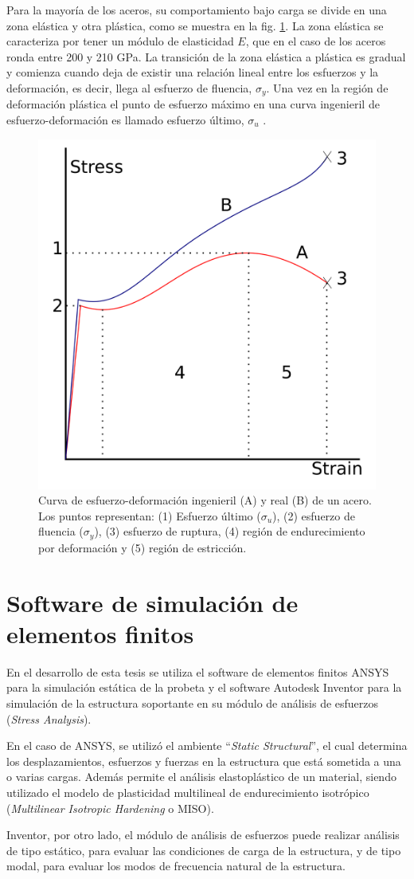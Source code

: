 Para la mayoría de los aceros, su comportamiento bajo carga se divide en una zona elástica y otra plástica, como se muestra en la fig. \ref{fig:esf-def_curve}. La zona elástica se caracteriza por tener un módulo de elasticidad $E$, que en el caso de los aceros ronda entre 200 y 210 GPa. La transición de la zona elástica a plástica es gradual y comienza cuando deja de existir una relación lineal entre los esfuerzos y la deformación, es decir, llega al esfuerzo de fluencia, $\sigma_y$. Una vez en la región de deformación plástica el punto de esfuerzo máximo en una curva ingenieril de esfuerzo-deformación es llamado esfuerzo último, $\sigma_u$ \cite{beer2010mecanica}.

\begin{figure}[h!]
\centering
\includegraphics[width=0.5\linewidth]{Imagenes/strain-stress_curve.png}
\caption{Curva de esfuerzo-deformación ingenieril (A) y real (B) de un acero. Los puntos representan: (1) Esfuerzo último ($\sigma_u$), (2) esfuerzo de fluencia ($\sigma_y$), (3) esfuerzo de ruptura, (4) región de endurecimiento por deformación y (5) región de estricción. \cite{richfield}}
\label{fig:esf-def_curve}
\end{figure}

\newpage

\section{Software de simulación de elementos finitos}

En el desarrollo de esta tesis se utiliza el software de elementos finitos ANSYS para la simulación estática de la probeta y el software Autodesk Inventor para la simulación de la estructura soportante en su módulo de análisis de esfuerzos (\textit{Stress Analysis}).

En el caso de ANSYS, se utilizó el ambiente ``\textit{Static Structural}'', el cual determina los desplazamientos, esfuerzos y fuerzas en la estructura que está sometida a una o varias cargas. Además permite el análisis elastoplástico de un material, siendo utilizado el modelo de plasticidad multilineal de endurecimiento isotrópico (\textit{Multilinear Isotropic Hardening} o MISO). 

Inventor, por otro lado, el módulo de análisis de esfuerzos puede realizar análisis de tipo estático, para evaluar las condiciones de carga de la estructura, y de tipo modal, para evaluar los modos de frecuencia natural de la estructura.


